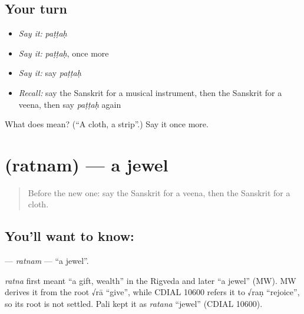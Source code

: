 \subsection*{Your turn}
\begin{itemize}
\raggedright
  \item \emph{Say it:} \emph{paṭṭaḥ}
  \item \emph{Say it:} \emph{paṭṭaḥ}, once more
  \item \emph{Say it:} say \emph{paṭṭaḥ}
  \item \emph{Recall:} say the Sanskrit for a musical instrument, then the Sanskrit for a veena, then say \emph{paṭṭaḥ} again
\end{itemize}

\begin{tcolorbox}[breakable,colback=teal!4,colframe=teal!35!black,title={Before you move on}]
What does  mean? (\textquotedblleft{}A cloth, a strip\textquotedblright{}.) Say it once more.
\end{tcolorbox}
\section[\texorpdfstring{\sk{रत्नम्} (ratnam)}{रत्नम् (ratnam)}]{ (ratnam) — a jewel}

\label{lesson:SA-C121-ratnam}



\begin{quote}
Before the new one: say the Sanskrit for a veena, then the Sanskrit for a cloth.
\end{quote}

\subsection*{You'll want to know: }
\textbf{} — \emph{ratnam} — \textquotedblleft{}a jewel\textquotedblright{}.

\begin{cousinweb}
\emph{ratna} first meant \textquotedblleft{}a gift, wealth\textquotedblright{} in the Rigveda and later \textquotedblleft{}a jewel\textquotedblright{} (MW). MW derives it from the root √rā \textquotedblleft{}give\textquotedblright{}, while CDIAL 10600 refers it to √raṇ \textquotedblleft{}rejoice\textquotedblright{}, so its root is not settled. Pali kept it as \emph{ratana} \textquotedblleft{}jewel\textquotedblright{} (CDIAL 10600).
\end{cousinweb}

